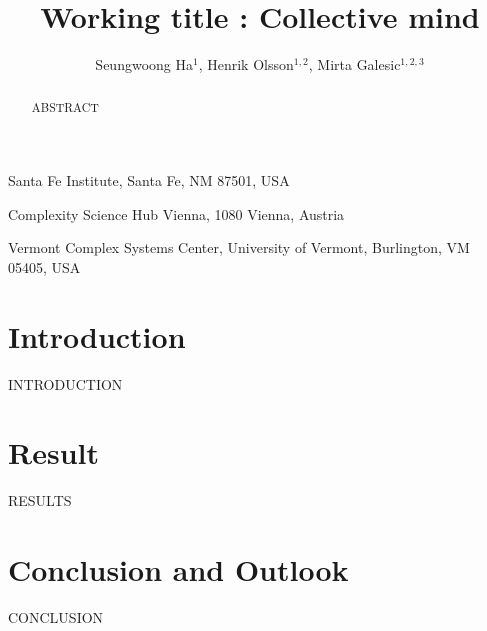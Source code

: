 \documentclass{nature}
\title{Working title : Collective mind}
\author{Seungwoong Ha$^{1}$, Henrik Olsson$^{1,2}$, Mirta Galesic$^{1,2,3}$}
\begin{document}
\maketitle

\begin{affiliations}
 \item Santa Fe Institute, Santa Fe, NM 87501, USA
 \item Complexity Science Hub Vienna, 1080 Vienna, Austria
 \item Vermont Complex Systems Center, University of Vermont, Burlington, VM 05405, USA
\end{affiliations}

\begin{abstract}

  ABSTRACT

\end{abstract}

\section{Introduction}

INTRODUCTION

\section{Result}

RESULTS

\section{Conclusion and Outlook}

CONCLUSION
\end{document}
